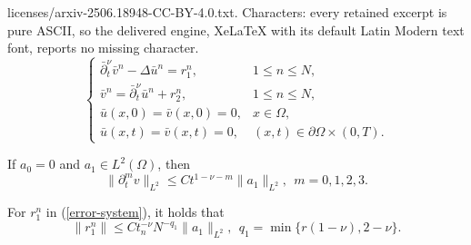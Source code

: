 \documentclass[10pt,a4paper]{amsart}
\begin{document}
licenses/arxiv-2506.18948-CC-BY-4.0.txt. Characters: every retained excerpt is pure ASCII, so the delivered engine, XeLaTeX with its default Latin Modern text font, reports no missing character.
\begin{equation}\label{error-system}
\begin{cases}
  \bar\partial_t^\nu \bar v^n - \Delta \bar u^n = r_1^n, & 1\le n\le N, \\
  \bar v^n  = \bar\partial_t^\nu \bar u^n + r_2^n, & 1\le n\le N, \\
  \bar u(x,0) = \bar v(x,0)=0, & x \in \Omega, \\
  \bar u(x,t) = \bar v(x,t)=0, & (x,t) \in \partial \Omega \times (0,T).
\end{cases}
\end{equation}

\begin{theorem}\label{thm-reg-L2-v}
If $a_0=0$ and $a_1\in L^2(\Omega)$, then
\[
\|\partial_t^mv\|_{L^2}\le Ct^{1-\nu-m}\|a_1\|_{L^2},~~m=0,1,2,3.
\]
\end{theorem}

\begin{lemma}\label{lem-r-1}
For $r_1^n$ in (\ref{error-system}), it holds that
\[
\|r_1^n\| \le Ct_n^{-\nu}N^{-q_1}\|a_1\|_{L^2},~~q_1=\min\{r(1-\nu),2-\nu\}.
\]
\end{lemma}
\end{document}

